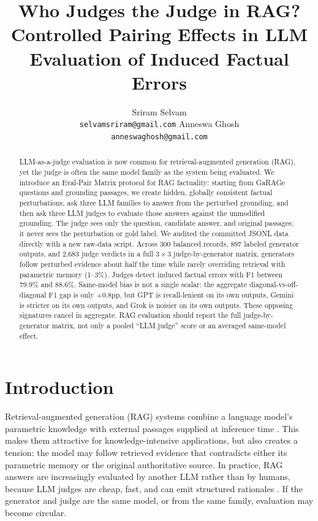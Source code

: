 \documentclass[11pt]{article}
\title{Who Judges the Judge in RAG?\\ Controlled Pairing Effects in LLM Evaluation of Induced Factual Errors}
\author{Sriram Selvam\\
  \texttt{selvamsriram@gmail.com}
  \And
  Anneswa Ghosh\\
  \texttt{anneswaghosh@gmail.com}}
\newcommand{\method}{Eval-Pair Matrix\xspace}
\newcommand{\pp}{\ensuremath{\mathrm{pp}}\xspace}
\begin{document}
\maketitle

\begin{abstract}
LLM-as-a-judge evaluation is now common for retrieval-augmented generation (RAG), yet the judge is often the same model family as the system being evaluated. We introduce an \method protocol for RAG factuality: starting from GaRAGe questions and grounding passages, we create hidden, globally consistent factual perturbations, ask three LLM families to answer from the perturbed grounding, and then ask three LLM judges to evaluate those answers against the unmodified grounding. The judge sees only the question, candidate answer, and original passages; it never sees the perturbation or gold label. We audited the committed JSONL data directly with a new raw-data script. Across 300 balanced records, 897 labeled generator outputs, and 2,683 judge verdicts in a full $3\times3$ judge-by-generator matrix, generators follow perturbed evidence about half the time while rarely overriding retrieval with parametric memory (1--3\%). Judges detect induced factual errors with F1 between 79.9\% and 88.6\%. Same-model bias is not a single scalar: the aggregate diagonal-vs-off-diagonal F1 gap is only +0.8\pp, but GPT is recall-lenient on its own outputs, Gemini is stricter on its own outputs, and Grok is noisier on its own outputs. These opposing signatures cancel in aggregate. RAG evaluation should report the full judge-by-generator matrix, not only a pooled ``LLM judge'' score or an averaged same-model effect.
\end{abstract}

\section{Introduction}

Retrieval-augmented generation (RAG) systems combine a language model's parametric knowledge with external passages supplied at inference time \citep{lewis2020rag}. This makes them attractive for knowledge-intensive applications, but also creates a tension: the model may follow retrieved evidence that contradicts either its parametric memory or the original authoritative source. In practice, RAG answers are increasingly evaluated by another LLM rather than by humans, because LLM judges are cheap, fast, and can emit structured rationales \citep{liu2023geval,zheng2023judging,kim2023prometheus}. If the generator and judge are the same model, or from the same family, evaluation may become circular.
\end{document}
